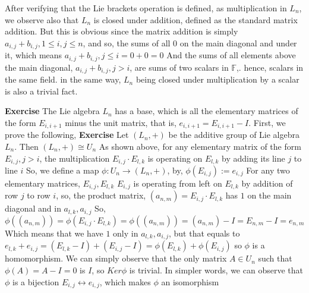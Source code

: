 \documentclass[12pt]{article}
\begin{document}
After verifying that the Lie brackets operation is defined, as multiplication in \( L_{n} \), we observe also that \( L_{n} \) \newline
is closed under addition, defined as the standard matrix addition. But this is obvious since the matrix addition is simply \( a_{i,j}+b_{i,j},1 \leq i,j \leq n \), \newline 
and so, the sums of all \( 0 \) on the main diagonal and under it, which means \( a_{i,j}+b_{i,j},j \leq i=0+0=0 \)\newline
And the sums of all elements above the main diagonal, \( a_{i,j}+b_{i,j},j > i \), are sums of two scalars in \( \mathbb{F} \),. \newline
hence, scalars in the same field. \newline
in the same way, \( L_{n} \) being closed under multiplication by a scalar is also a trivial fact. \newline

\textbf{Exercise} The Lie algebra \( L_{n} \) has a base, which is all the elementary matrices \newline
of the form \( E_{i,i+1} \) minus the unit matrix, that is, \( e_{i,i+1}=E_{i,i+1}-I \). \newline
\proof \newline
First, we prove the following, \newline
\textbf{Exercise} Let $(L_n,+)$ be the additive group of Lie algebra \( L_{n} \). \newline
Then $(L_n,+) \cong U_n$ \newline
\proof \newline
As shown above, for any elementary matrix of the form $E_{i,j},j>i$, 
the multiplication $E_{i,j} \cdot E_{l,k}$ is operating on $E_{l,k}$ by adding its line $j$ to line $i$ \newline
So, we define a map $\phi:U_n \rightarrow (L_n,+)$, by, \newline
$\phi(E_{i,j}):=e_{i,j}$ \newline
For any two elementary matrices, $E_{i,j},E_{l,k}$
\( E_{i,j} \) is operating from left on \( E_{l,k} \) by addition of row \( j \) to row \( i \),
so, the product matrix, \( (a_{n,m})=E_{i,j} \cdot E_{l,k} \) has \( 1 \) on the main diagonal and in \( a_{l,k},a_{i,j} \) \newline
So, $\phi((a_{n,m}))=\phi(E_{i,j} \cdot E_{l,k})=\phi((a_{n,m}))=(a_{n,m})-I=E_{n,m}-I=e_{n,m}$ \newline
Which means that we have $1$ only in $a_{l,k},a_{i,j}$, but that equals to $e_{l,k}+e_{i,j}=(E_{l,k}-I)+(E_{i,j}-I)=\phi(E_{l,k})+\phi(E_{i,j})$ \newline so $\phi$ is a homomorphism. \newline
We can simply observe that the only matrix $A \in U_n$ such that $\phi(A)=A-I=0$ is $I$, so $Ker \phi$ is trivial. \newline
In simpler words, we can observe that $\phi$ is a bijection $E_{i,j} \leftrightarrow e_{i,j}$, \newline
which makes $\phi$ an isomorphism \newline
\end{document}
